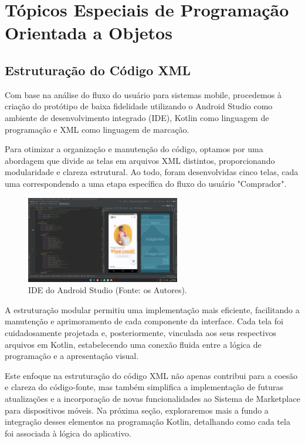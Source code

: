 \documentclass[
	12pt,				%
	openright,			%
	twoside,			%
	a4paper,			%
	english,			%
	brazil				%
	]{abntex2}
\begin{document}
\chapter{Tópicos Especiais de Programação Orientada a Objetos}\label{cap_topic_espec_de_progra}

\section{Estruturação do Código XML}

Com base na análise do fluxo do usuário para sistemas mobile, procedemos à criação do protótipo de baixa fidelidade utilizando o Android Studio como ambiente de desenvolvimento integrado (IDE), Kotlin como linguagem de programação e XML como linguagem de marcação.

Para otimizar a organização e manutenção do código, optamos por uma abordagem que divide as telas em arquivos XML distintos, proporcionando modularidade e clareza estrutural. Ao todo, foram desenvolvidas cinco telas, cada uma correspondendo a uma etapa específica do fluxo do usuário "Comprador".

\begin{figure}[htb]
    \centering
    \includegraphics[width=0.6\textwidth]{img/IDE-android-studio}
    \caption{IDE do Android Studio (Fonte: os Autores).}
    \label{fig:ide_android_studio}
\end{figure}

A estruturação modular permitiu uma implementação mais eficiente, facilitando a manutenção e aprimoramento de cada componente da interface. Cada tela foi cuidadosamente projetada e, posteriormente, vinculada aos seus respectivos arquivos em Kotlin, estabelecendo uma conexão fluida entre a lógica de programação e a apresentação visual.

Este enfoque na estruturação do código XML não apenas contribui para a coesão e clareza do código-fonte, mas também simplifica a implementação de futuras atualizações e a incorporação de novas funcionalidades ao Sistema de Marketplace para dispositivos móveis. Na próxima seção, exploraremos mais a fundo a integração desses elementos na programação Kotlin, detalhando como cada tela foi associada à lógica do aplicativo.
\end{document}
